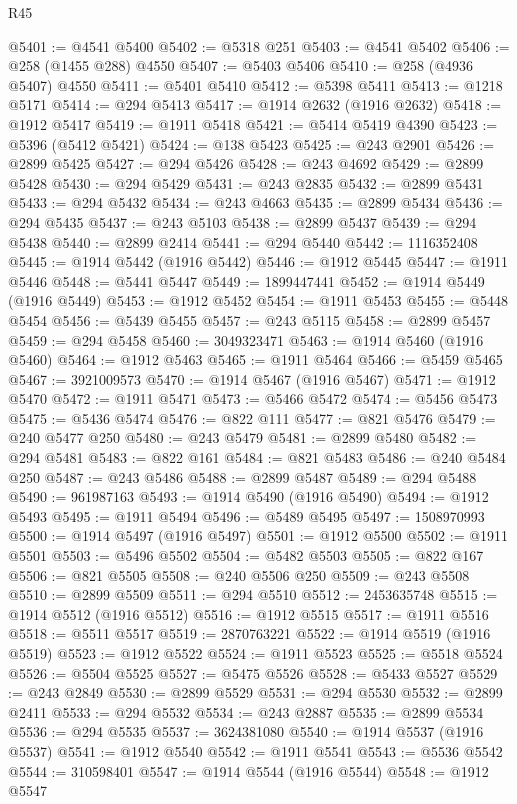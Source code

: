 \begin{lexlean}{R45}
\begin{coremodule}
{@5401 := @4541 @5400
@5402 := @5318 @251
@5403 := @4541 @5402
@5406 := @258 (@1455 @288) @4550
@5407 := @5403 @5406
@5410 := @258 (@4936 @5407) @4550
@5411 := @5401 @5410
@5412 := @5398 @5411
@5413 := @1218 @5171
@5414 := @294 @5413
@5417 := @1914 @2632 (@1916 @2632)
@5418 := @1912 @5417
@5419 := @1911 @5418
@5421 := @5414 @5419 @4390
@5423 := @5396 (@5412 @5421)
@5424 := @138 @5423
@5425 := @243 @2901
@5426 := @2899 @5425
@5427 := @294 @5426
@5428 := @243 @4692
@5429 := @2899 @5428
@5430 := @294 @5429
@5431 := @243 @2835
@5432 := @2899 @5431
@5433 := @294 @5432
@5434 := @243 @4663
@5435 := @2899 @5434
@5436 := @294 @5435
@5437 := @243 @5103
@5438 := @2899 @5437
@5439 := @294 @5438
@5440 := @2899 @2414
@5441 := @294 @5440
@5442 := 1116352408
@5445 := @1914 @5442 (@1916 @5442)
@5446 := @1912 @5445
@5447 := @1911 @5446
@5448 := @5441 @5447
@5449 := 1899447441
@5452 := @1914 @5449 (@1916 @5449)
@5453 := @1912 @5452
@5454 := @1911 @5453
@5455 := @5448 @5454
@5456 := @5439 @5455
@5457 := @243 @5115
@5458 := @2899 @5457
@5459 := @294 @5458
@5460 := 3049323471
@5463 := @1914 @5460 (@1916 @5460)
@5464 := @1912 @5463
@5465 := @1911 @5464
@5466 := @5459 @5465
@5467 := 3921009573
@5470 := @1914 @5467 (@1916 @5467)
@5471 := @1912 @5470
@5472 := @1911 @5471
@5473 := @5466 @5472
@5474 := @5456 @5473
@5475 := @5436 @5474
@5476 := @822 @111
@5477 := @821 @5476
@5479 := @240 @5477 @250
@5480 := @243 @5479
@5481 := @2899 @5480
@5482 := @294 @5481
@5483 := @822 @161
@5484 := @821 @5483
@5486 := @240 @5484 @250
@5487 := @243 @5486
@5488 := @2899 @5487
@5489 := @294 @5488
@5490 := 961987163
@5493 := @1914 @5490 (@1916 @5490)
@5494 := @1912 @5493
@5495 := @1911 @5494
@5496 := @5489 @5495
@5497 := 1508970993
@5500 := @1914 @5497 (@1916 @5497)
@5501 := @1912 @5500
@5502 := @1911 @5501
@5503 := @5496 @5502
@5504 := @5482 @5503
@5505 := @822 @167
@5506 := @821 @5505
@5508 := @240 @5506 @250
@5509 := @243 @5508
@5510 := @2899 @5509
@5511 := @294 @5510
@5512 := 2453635748
@5515 := @1914 @5512 (@1916 @5512)
@5516 := @1912 @5515
@5517 := @1911 @5516
@5518 := @5511 @5517
@5519 := 2870763221
@5522 := @1914 @5519 (@1916 @5519)
@5523 := @1912 @5522
@5524 := @1911 @5523
@5525 := @5518 @5524
@5526 := @5504 @5525
@5527 := @5475 @5526
@5528 := @5433 @5527
@5529 := @243 @2849
@5530 := @2899 @5529
@5531 := @294 @5530
@5532 := @2899 @2411
@5533 := @294 @5532
@5534 := @243 @2887
@5535 := @2899 @5534
@5536 := @294 @5535
@5537 := 3624381080
@5540 := @1914 @5537 (@1916 @5537)
@5541 := @1912 @5540
@5542 := @1911 @5541
@5543 := @5536 @5542
@5544 := 310598401
@5547 := @1914 @5544 (@1916 @5544)
@5548 := @1912 @5547
}
\end{coremodule}
\end{lexlean}
